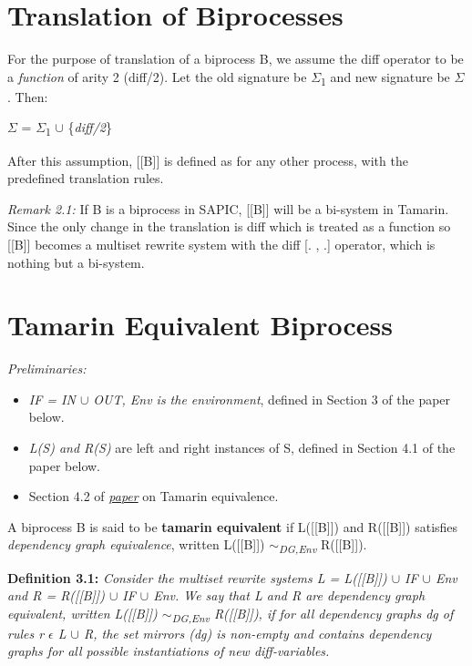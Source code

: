 \documentclass[11pt]{article}
\begin{document}
\section{Translation of Biprocesses}
\vspace{4pt}
For the purpose of translation of a biprocess B, we assume the diff operator to be a {\it function} of arity 2 (diff/2). Let the old signature be $\Sigma$\textsubscript{1} and new signature be $\Sigma$. Then:
\begin{center}
    $\Sigma$ = $\Sigma$\textsubscript{1} $\cup$ \{{\it diff/2}\}  
\end{center}
After this assumption, [[B]] is defined as for any other process, with the predefined translation rules.\newline

{\it Remark 2.1: }If B is a biprocess in SAPIC, [[B]] will be a bi-system in Tamarin. Since the only change in the translation is diff which is treated as a function so [[B]] becomes a multiset rewrite system with the diff [. , .] operator, which is nothing but a bi-system. 
\vspace{5pt}
\section{Tamarin Equivalent Biprocess}
{\it Preliminaries: } 
\begin{itemize}
    \item {\it IF = IN $\cup$ OUT, Env is the environment}, defined in Section 3 of the paper below.
    \vspace{-2pt}
    \item {\it L(S) and R(S)} are left and right instances of S, defined in Section 4.1 of the paper below.
    \vspace{-2pt}
    \item Section 4.2 of \href{https://hal.archives-ouvertes.fr/hal-01337409v2/document}{{\it paper}} on Tamarin equivalence.\newline\newline
\end{itemize}
\vspace{-1cm}
\vspace{8pt}
A biprocess B is said to be {\bf tamarin equivalent} if L([[B]]) and R([[B]]) satisfies {\it dependency graph equivalence}, written L([[B]]) {\it $\sim$\textsubscript{DG,Env}} R([[B]]).\newline

{\bf Definition 3.1: }{\it Consider the multiset rewrite systems L = L([[B]]) $\cup$ IF $\cup$ Env and R = R([[B]]) $\cup$ IF $\cup$ Env. We say  that L and R are  dependency  graph  equivalent, written L([[B]]) {\it $\sim$\textsubscript{DG,Env}} R([[B]]), if for all dependency graphs dg of rules r $\epsilon$ L $\cup$ R, the set mirrors (dg) is non-empty and contains dependency graphs for all possible instantiations of new diff-variables.}
\end{document}
